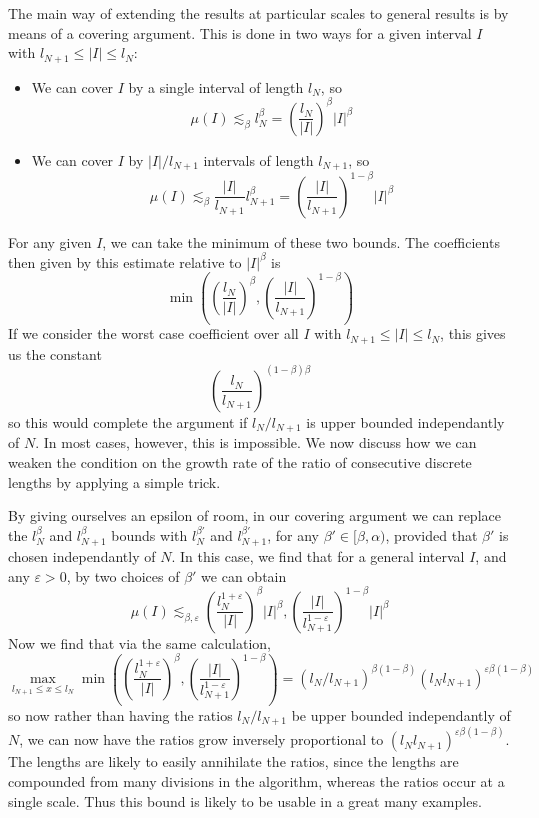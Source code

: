 \documentclass{report}
\theoremstyle{plain}
\theoremstyle{plain}
\begin{document}
The main way of extending the results at particular scales to general results is by means of a covering argument. This is done in two ways for a given interval $I$ with $l_{N+1} \leq |I| \leq l_N$:
%
\begin{itemize}
    \item We can cover $I$ by a single interval of length $l_N$, so
    \[ \mu(I) \lesssim_\beta l_N^\beta = \left( \frac{l_N}{|I|} \right)^\beta |I|^\beta \]
    \item We can cover $I$ by $|I|/l_{N+1}$ intervals of length $l_{N+1}$, so
    \[ \mu(I) \lesssim_\beta \frac{|I|}{l_{N+1}} l_{N+1}^\beta = \left( \frac{|I|}{l_{N+1}} \right)^{1 - \beta} |I|^\beta \]
\end{itemize}
%
For any given $I$, we can take the minimum of these two bounds. The coefficients then given by this estimate relative to $|I|^\beta$ is
%
\[ \min \left( \left( \frac{l_N}{|I|} \right)^\beta, \left( \frac{|I|}{l_{N+1}} \right)^{1 - \beta} \right) \]
%
If we consider the worst case coefficient over all $I$ with $l_{N+1} \leq |I| \leq l_N$, this gives us the constant
%
\[ \left( \frac{l_N}{l_{N+1}} \right)^{(1 - \beta)\beta} \]
%
so this would complete the argument if $l_N/l_{N+1}$ is upper bounded independantly of $N$. In most cases, however, this is impossible. We now discuss how we can weaken the condition on the growth rate of the ratio of consecutive discrete lengths by applying a simple trick.

By giving ourselves an epsilon of room, in our covering argument we can replace the $l_N^\beta$ and $l_{N+1}^\beta$ bounds with $l_N^{\beta'}$ and $l_{N+1}^{\beta'}$, for any $\beta' \in [\beta, \alpha)$, provided that $\beta'$ is chosen independantly of $N$. In this case, we find that for a general interval $I$, and any $\varepsilon > 0$, by two choices of $\beta'$ we can obtain
%
\[ \mu(I) \lesssim_{\beta,\varepsilon} \left( \frac{l_N^{1 + \varepsilon}}{|I|} \right)^\beta |I|^\beta, \left( \frac{|I|}{l_{N+1}^{1 - \varepsilon}} \right)^{1 - \beta} |I|^\beta \]
%
Now we find that via the same calculation,
%
\[ \max_{l_{N+1} \leq x \leq l_N} \min \left( \left( \frac{l_N^{1 + \varepsilon}}{|I|} \right)^\beta, \left( \frac{|I|}{l_{N+1}^{1 - \varepsilon}} \right)^{1 - \beta} \right) = (l_N/l_{N+1})^{\beta(1-\beta)} (l_N l_{N+1})^{\varepsilon \beta(1-\beta)} \]
%
so now rather than having the ratios $l_N/l_{N+1}$ be upper bounded independantly of $N$, we can now have the ratios grow inversely proportional to $(l_N l_{N+1})^{\varepsilon \beta (1 - \beta)}$. The lengths are likely to easily annihilate the ratios, since the lengths are compounded from many divisions in the algorithm, whereas the ratios occur at a single scale. Thus this bound is likely to be usable in a great many examples.
\end{document}
